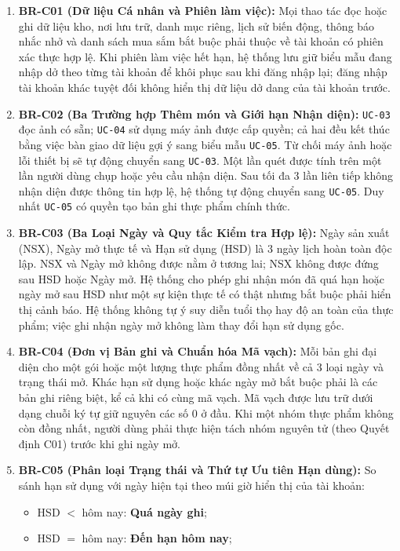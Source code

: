 \documentclass[10pt,a4paper]{article}
\begin{document}
\begin{enumerate}[leftmargin=2em,itemsep=6pt]
    \item \textbf{BR-C01 (Dữ liệu Cá nhân và Phiên làm việc):} Mọi thao tác đọc hoặc ghi dữ liệu kho, nơi lưu trữ, danh mục riêng, lịch sử biến động, thông báo nhắc nhở và danh sách mua sắm bắt buộc phải thuộc về tài khoản có phiên xác thực hợp lệ. Khi phiên làm việc hết hạn, hệ thống lưu giữ biểu mẫu đang nhập dở theo từng tài khoản để khôi phục sau khi đăng nhập lại; đăng nhập tài khoản khác tuyệt đối không hiển thị dữ liệu dở dang của tài khoản trước.
    \item \textbf{BR-C02 (Ba Trường hợp Thêm món và Giới hạn Nhận diện):} \texttt{UC-03} đọc ảnh có sẵn; \texttt{UC-04} sử dụng máy ảnh được cấp quyền; cả hai đều kết thúc bằng việc bàn giao dữ liệu gợi ý sang biểu mẫu \texttt{UC-05}. Từ chối máy ảnh hoặc lỗi thiết bị sẽ tự động chuyển sang \texttt{UC-03}. Một lần quét được tính trên một lần người dùng chụp hoặc yêu cầu nhận diện. Sau tối đa 3 lần liên tiếp không nhận diện được thông tin hợp lệ, hệ thống tự động chuyển sang \texttt{UC-05}. Duy nhất \texttt{UC-05} có quyền tạo bản ghi thực phẩm chính thức.
    \item \textbf{BR-C03 (Ba Loại Ngày và Quy tắc Kiểm tra Hợp lệ):} Ngày sản xuất (NSX), Ngày mở thực tế và Hạn sử dụng (HSD) là 3 ngày lịch hoàn toàn độc lập. NSX và Ngày mở không được nằm ở tương lai; NSX không được đứng sau HSD hoặc Ngày mở. Hệ thống cho phép ghi nhận món đã quá hạn hoặc ngày mở sau HSD như một sự kiện thực tế có thật nhưng bắt buộc phải hiển thị cảnh báo. Hệ thống không tự ý suy diễn tuổi thọ hay độ an toàn của thực phẩm; việc ghi nhận ngày mở không làm thay đổi hạn sử dụng gốc.
    \item \textbf{BR-C04 (Đơn vị Bản ghi và Chuẩn hóa Mã vạch):} Mỗi bản ghi đại diện cho một gói hoặc một lượng thực phẩm đồng nhất về cả 3 loại ngày và trạng thái mở. Khác hạn sử dụng hoặc khác ngày mở bắt buộc phải là các bản ghi riêng biệt, kể cả khi có cùng mã vạch. Mã vạch được lưu trữ dưới dạng chuỗi ký tự giữ nguyên các số 0 ở đầu. Khi một nhóm thực phẩm không còn đồng nhất, người dùng phải thực hiện tách nhóm nguyên tử (theo Quyết định C01) trước khi ghi ngày mở.
    \item \textbf{BR-C05 (Phân loại Trạng thái và Thứ tự Ưu tiên Hạn dùng):} So sánh hạn sử dụng với ngày hiện tại theo múi giờ hiển thị của tài khoản:
    \begin{itemize}
        \item HSD $<$ hôm nay: \textbf{Quá ngày ghi};
        \item HSD $=$ hôm nay: \textbf{Đến hạn hôm nay};

\end{itemize}
\end{enumerate}
\end{document}
